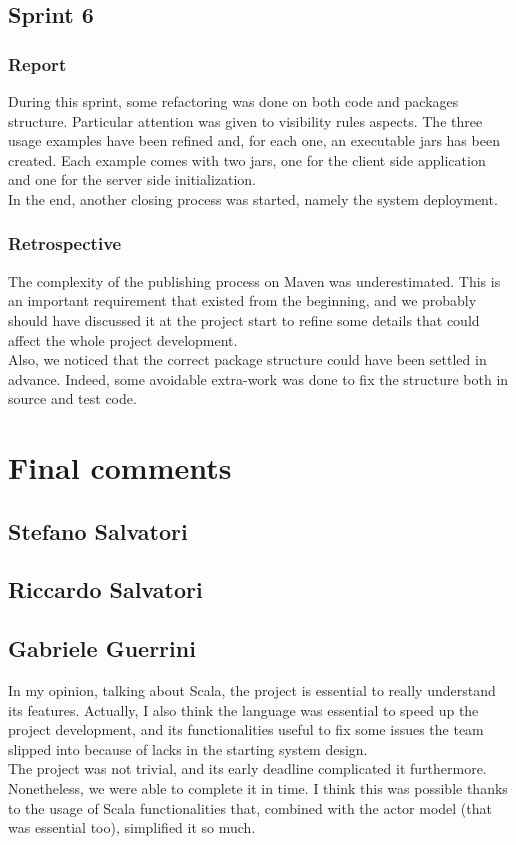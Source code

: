 \subsection{Sprint 6}

\subsubsection{Report}
During this sprint, some refactoring was done on both code and packages structure. Particular attention was given to visibility rules aspects.
The three usage examples have been refined and, for each one, an executable jars has been created. Each example comes with two jars, one for the client side application and one for the server side initialization.
\\
In the end, another closing process was started, namely the system deployment.


\subsubsection{Retrospective}
The complexity of the publishing process on Maven was underestimated.
This is an important requirement that existed from the beginning, and we probably should have discussed it at the project start to refine some details that could affect the whole project development. 
\\
Also, we noticed that the correct package structure could have been settled in advance. 
Indeed, some avoidable extra-work was done to fix the structure both in source and test code.

\section{Final comments}
\subsection{Stefano Salvatori}

\subsection{Riccardo Salvatori}

\subsection{Gabriele Guerrini}
 
In my opinion, talking about Scala, the project is essential to really understand its features. Actually, I also think the language was essential to speed up the project development, and its functionalities useful to fix some issues the team slipped into because of lacks in the starting system design. 
\\
The project was not trivial, and its early deadline complicated it furthermore. Nonetheless, we were able to complete it in time. I think this was possible thanks to the usage of Scala functionalities that, combined with the actor model (that was essential too), simplified it so much.

